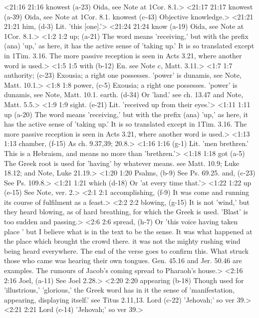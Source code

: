 <21:16 21:16  knowest (a-23)  Oida, see Note at 1Cor. 8.1.>
<21:17 21:17  knowest (a-39)  Oida, see Note at 1Cor. 8.1.
  knowest (c-43)  Objective knowledge.>
<21:21 21:21  him, (d-3)  Lit. 'this [one].'>
<21:24 21:24  know (a-19)  Oida, see Note at 1Cor. 8.1.>
<1:2 1:2  up; (a-21) The word means 'receiving,' but with the prefix (ana) 'up,'  as here, it has the active sense of 'taking up.' It is so  translated except in 1Tim. 3.16. The more passive reception is  seen in Acts 3.21, where another word is used.>
<1:5 1:5  with (b-12)  En. see Note c, Matt. 3.11.>
<1:7 1:7  authority; (c-23) Exousia; a right one possesses. 'power' is dunamis, see  Note, Matt. 10.1.>
<1:8 1:8  power, (c-5)  Exousia; a right one possesses. 'power' is dunamis, see  Note, Matt. 10.1.
  earth. (d-34)  Or 'land.' see ch. 13.47 and Note, Matt. 5.5.>
<1:9 1:9  sight. (e-21)  Lit. 'received up from their eyes.'>
<1:11 1:11  up (a-20)  The word means 'receiving,' but with the prefix (ana) 'up,'  as here, it has the active sense of 'taking up.' It is so  translated except in 1Tim. 3.16. The more passive reception is  seen in Acts 3.21, where another word is used.>
<1:13 1:13  chamber, (f-15)  As ch. 9.37,39; 20.8.>
<1:16 1:16   (g-1)  Lit. 'men brethren.' This is a Hebraism, and means no more  than 'brethren.'>
<1:18 1:18  got (a-5)  The Greek root is used for 'having' by whatever means. see  Matt. 10.9; Luke 18.12; and Note, Luke 21.19.>
<1:20 1:20  Psalms, (b-9)  See Ps. 69.25.
  and, (c-23)  See Ps. 109.8.>
<1:21 1:21  which (d-18)  Or 'at every time that.'>
<1:22 1:22  up (e-15)  See Note, ver. 2.>
<2:1 2:1  accomplishing, (f-9)  It was come and running its course of fulfilment as a feast.>
<2:2 2:2  blowing, (g-15)  It is not 'wind,' but they heard blowing, as of hard  breathing, for which the Greek is used. 'Blast' is too sudden  and passing.>
<2:6 2:6  spread, (h-7)  Or 'this voice having taken place ' but I believe what is in  the text to be the sense. It was what happened at the place  which brought the crowd there. it was not the mighty rushing  wind being heard everywhere. The end of the verse goes to  confirm this. What struck those who came was hearing their own  tongues. Gen. 45.16 and Jer. 50.46 are examples. The rumours of  Jacob's coming spread to Pharaoh's house.>
<2:16 2:16  Joel, (a-11)  See Joel 2.28.>
<2:20 2:20  appearing (b-18)  Though used for 'illustrious,' 'glorious,' the Greek word has  in it the sense of 'manifestation, appearing, displaying  itself.' see Titus 2.11,13.
  Lord (c-22) 'Jehovah;' so ver 39.>
<2:21 2:21  Lord (c-14)  'Jehovah;' so ver 39.>
